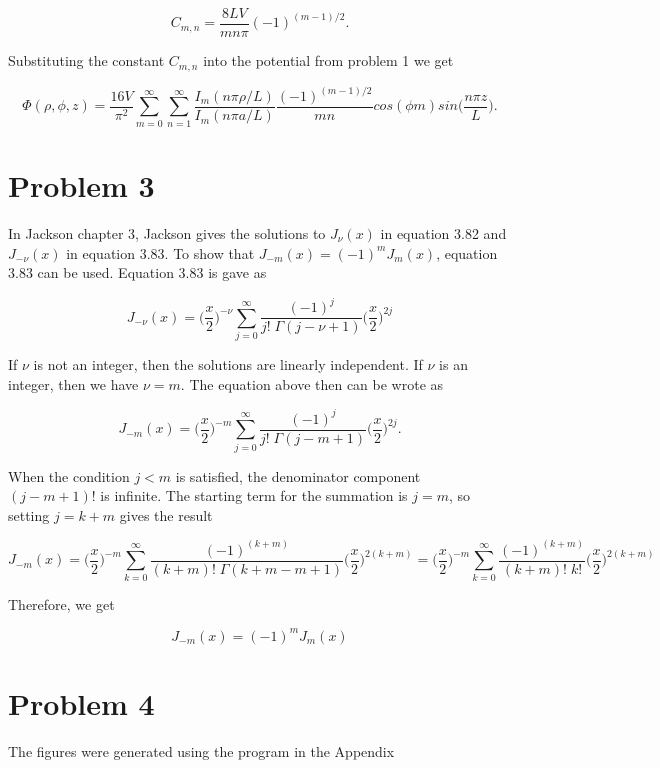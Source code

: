 \documentclass[11pt]{article}
\begin{document}
$$
C_{m,n} = \frac{8LV}{mn\pi} (-1)^{(m-1)/2}.
$$

Substituting the constant $C_{m,n}$ into the potential from problem 1 we get

$$
\Phi(\rho, \phi, z) = \frac{16V}{\pi^{2}} \sum_{m = 0}^{\infty} \sum_{n = 1}^{\infty} \frac{I_{m}(n\pi \rho / L)}{I_{m}(n\pi a / L)} \frac{(-1)^{(m-1)/2}}{mn}  cos(\phi m) sin\Big(\frac{n\pi z}{L} \Big).
$$


\clearpage

\section*{Problem 3}

In Jackson chapter 3, Jackson gives the solutions to $J_{\nu}(x)$ in equation 3.82 and $J_{-\nu}(x)$ in equation 3.83. To show that $J_{-m}(x) = (-1)^{m}J_{m}(x)$, equation 3.83 can be used. Equation 3.83 is gave as 

$$
J_{-\nu}(x) = \Bigg(\frac{x}{2}\Bigg)^{-\nu} \sum_{j=0}^{\infty} \frac{(-1)^{j}}{j! \; \Gamma(j - \nu + 1)} \Bigg(\frac{x}{2}\Bigg)^{2j}
$$

If $\nu$ is not an integer, then the solutions are linearly independent. If $\nu$ is an integer, then we have $\nu = m$. The equation above then can be wrote as

$$
J_{-m}(x) = \Bigg(\frac{x}{2}\Bigg)^{-m} \sum_{j=0}^{\infty} \frac{(-1)^{j}}{j! \; \Gamma(j - m + 1)} \Bigg(\frac{x}{2}\Bigg)^{2j}.
$$

When the condition $j < m$ is satisfied, the denominator component $(j - m + 1)!$ is infinite.  The starting term for the summation is $j = m$, so setting $j = k + m$ gives the result 

$$
J_{-m}(x) = \Bigg(\frac{x}{2}\Bigg)^{-m} \sum_{k = 0}^{\infty} \frac{(-1)^{(k + m)}}{(k + m)! \; \Gamma(k + m - m + 1)} \Bigg(\frac{x}{2}\Bigg)^{2(k + m)} = 
\Bigg(\frac{x}{2}\Bigg)^{-m} \sum_{k = 0}^{\infty} \frac{(-1)^{(k + m)}}{(k + m)! \; k!} \Bigg(\frac{x}{2}\Bigg)^{2(k + m)} 
$$

Therefore, we get 

$$
J_{-m}(x) = (-1)^{m}J_{m}(x)
$$

\clearpage

\section*{Problem 4}

The figures were generated using the program in the Appendix
\end{document}
